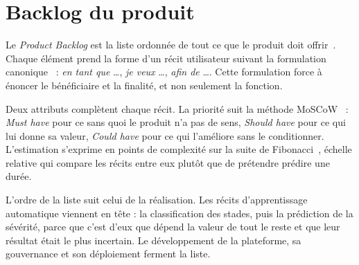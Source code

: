 \section{Backlog du produit}

Le \emph{Product Backlog} est la liste ordonnée de tout ce que le produit doit
offrir~\cite{schwaber2020}. Chaque élément prend la forme d'un récit utilisateur suivant la
formulation canonique~\cite{cohn2004} : \emph{en tant que} \dots, \emph{je veux} \dots,
\emph{afin de} \dots. Cette
formulation force à énoncer le bénéficiaire et la finalité, et non seulement la
fonction.

Deux attributs complètent chaque récit. La priorité suit la méthode MoSCoW~\cite{clegg1994} :
\emph{Must have} pour ce sans quoi le produit n'a pas de sens, \emph{Should have} pour
ce qui lui donne sa valeur, \emph{Could have} pour ce qui l'améliore sans le
conditionner. L'estimation s'exprime en points de complexité sur la suite de
Fibonacci~\cite{cohn2005}, échelle relative qui compare les récits entre eux plutôt que de prétendre
prédire une durée.

L'ordre de la liste suit celui de la réalisation. Les récits d'apprentissage
automatique viennent en tête : la classification des stades, puis la prédiction de la
sévérité, parce que c'est d'eux que dépend la valeur de tout le reste et que leur
résultat était le plus incertain. Le développement de la plateforme, sa gouvernance et
son déploiement ferment la liste.

